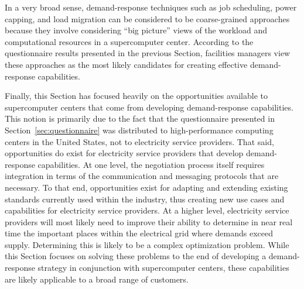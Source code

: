 In a very broad sense, demand-response techniques such as job
scheduling, power capping, and load migration can be considered to
be coarse-grained approaches because they involve considering ``big
picture'' views of the workload and computational resources in a
supercomputer center.  According to the questionnaire results
presented in the previous Section, facilities managers view these
approaches as the most likely candidates for creating effective
demand-response capabilities.

Finally, this Section has focused heavily on the opportunities available
to supercomputer centers that come from developing demand-response
capabilities.  This notion is primarily due to the fact that the
questionnaire presented in Section~\ref{sec:questionnaire} was
distributed to high-performance computing centers in the United
States, not to electricity service providers.  That said, opportunities do
exist for electricity service providers that develop demand-response
capabilities.  At one level, the negotiation process itself requires
integration in terms of the communication and messaging protocols that
are necessary.  To that end, opportunities exist for adapting and extending
existing standards currently used within the industry, thus creating new
use cases and capabilities for electricity service providers.  At a higher
level, electricity service providers will most likely need to improve their
ability to determine in near real time the important places within the
electrical grid where demands exceed supply.  Determining this is likely
to be a complex optimization problem.  While this Section focuses on
solving these problems to the end of developing a demand-response
strategy in conjunction with supercomputer centers, these capabilities
are likely applicable to a broad range of customers.
